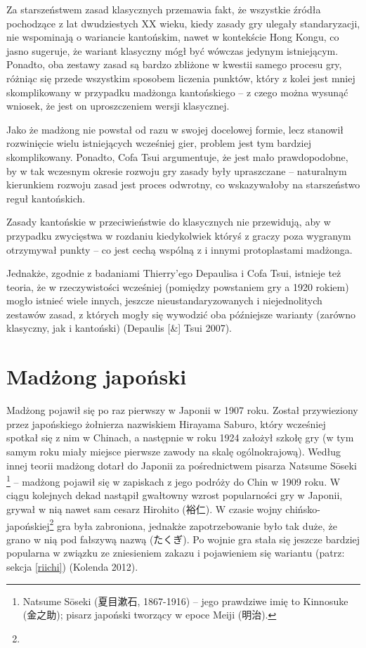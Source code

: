 Za starszeństwem zasad klasycznych przemawia fakt, że wszystkie źródła
pochodzące z lat dwudziestych XX wieku, kiedy zasady gry ulegały standaryzacji,
nie wspominają o wariancie kantońskim, nawet w kontekście Hong Kongu,
co jasno sugeruje, że wariant klasyczny mógł być wówczas jedynym istniejącym.
Ponadto, oba zestawy zasad są bardzo zbliżone w kwestii samego procesu gry,
różniąc się przede wszystkim sposobem liczenia punktów, który z kolei jest mniej
skomplikowany w przypadku madżonga kantońskiego -- z czego można wysunąć
wniosek, że jest on uproszczeniem wersji klasycznej.

Jako że madżong nie powstał od razu w swojej docelowej formie, lecz stanowił
rozwinięcie wielu istniejących wcześniej gier, problem jest tym bardziej
skomplikowany. Ponadto, Cofa Tsui argumentuje, że jest mało prawdopodobne, by w
tak wczesnym okresie rozwoju gry zasady były upraszczane -- naturalnym
kierunkiem rozwoju zasad jest proces odwrotny, co wskazywałoby na starszeństwo
reguł kantońskich.

Zasady kantońskie w przeciwieństwie do klasycznych nie przewidują, aby w
przypadku zwycięstwa w rozdaniu kiedykolwiek któryś z graczy poza wygranym
otrzymywał punkty -- co jest cechą wspólną z  i innymi
protoplastami madżonga. 

Jednakże, zgodnie z badaniami Thierry'ego Depaulisa i Cofa Tsui, istnieje też
teoria, że w rzeczywistości wcześniej (pomiędzy powstaniem gry a 1920 rokiem)
mogło istnieć wiele innych, jeszcze nieustandaryzowanych i niejednolitych
zestawów zasad, z których mogły się wywodzić oba późniejsze warianty (zarówno
klasyczny, jak i kantoński) (Depaulis [\&] Tsui 2007).

\section{Madżong japoński}
Madżong pojawił się po raz pierwszy w Japonii w 1907 roku. Został przywieziony
przez japońskiego żołnierza nazwiskiem Hirayama Saburo, który wcześniej spotkał
się z nim w Chinach, a następnie w roku 1924 założył szkołę gry (w tym samym
roku miały miejsce pierwsze zawody na skalę ogólnokrajową). Według innej teorii
madżong dotarł do Japonii za pośrednictwem pisarza Natsume Sōseki
\footnote{Natsume Sōseki (夏目漱石, 1867-1916) -- jego prawdziwe imię to Kinnosuke
(金之助); pisarz japoński tworzący w epoce Meiji (明治).} -- madżong pojawił się w
zapiskach z jego podróży do Chin w 1909 roku. W ciągu kolejnych dekad nastąpił
gwałtowny wzrost popularności gry w Japonii, grywał w nią nawet sam cesarz
Hirohito (裕仁). W czasie wojny chińsko-japońskiej\footnote{} gra była zabroniona,
jednakże zapotrzebowanie było tak duże, że grano w nią pod fałszywą nazwą
 (たくぎ). Po wojnie gra stała się jeszcze bardziej popularna w
związku ze zniesieniem zakazu i pojawieniem się wariantu  (patrz:
sekcja \ref{riichi}) (Kolenda 2012).

